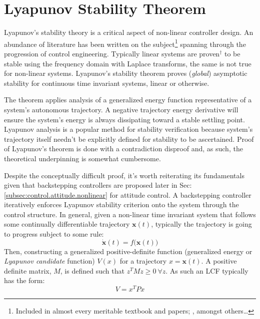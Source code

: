 \section{Lyapunov Stability Theorem}
\label{sec:control.lyapunov}
Lyapunov's stability theory is a critical aspect of non-linear controller design. An abundance of literature has been written on the subject\footnote{Included in almost every meritable textbook and papers; \cite{noteonlyapunov,nonlinearsystems}, amongst others\ldots} spanning through the progression of control engineering. Typically linear systems are proven$^\dagger$ to be stable using the frequency domain with Laplace transforms, the same is not true for non-linear systems. Lyapunov's stability theorem proves (\emph{global}) asymptotic stability for continuous time invariant systems, linear or otherwise.
\par
The theorem applies analysis of a generalized energy function representative of a system's autonomous trajectory. A negative trajectory energy derivative will ensure the system's energy is always dissipating toward a stable settling point. Lyapunov analysis is a popular method for stability verification because system's trajectory itself needn't be explicitly defined for stability to be ascertained. Proof of Lyapunov's theorem is done with a contradiction disproof and, as such, the theoretical underpinning is somewhat cumbersome.
\par
Despite the conceptually difficult proof, it's worth reiterating its fundamentals given that backstepping controllers are proposed later in Sec:\ref{subsec:control.attitude.nonlinear} for attitude control. A backstepping controller iteratively enforces Lyapunov stability criterion onto the system through the control structure. In general, given a non-linear time invariant system that follows some continually differentiable trajectory $\mathbf{x}(t)$, typically the trajectory is going to progress subject to some rule:
\begin{equation}
\dot{\mathbf{x}}(t)=f\big(\mathbf{x}(t)\big)
\end{equation}
Then, constructing a generalized positive-definite function (generalized energy or \emph{Lyapunov candidate} function) $V(x)$ for a trajectory $x=\mathbf{x}(t)$. A positive definite matrix, $M$, is defined such that $z^TMz\geq 0~\forall z$. As such an LCF typically has the form:
\begin{equation}
V=x^TPx
\end{equation}
